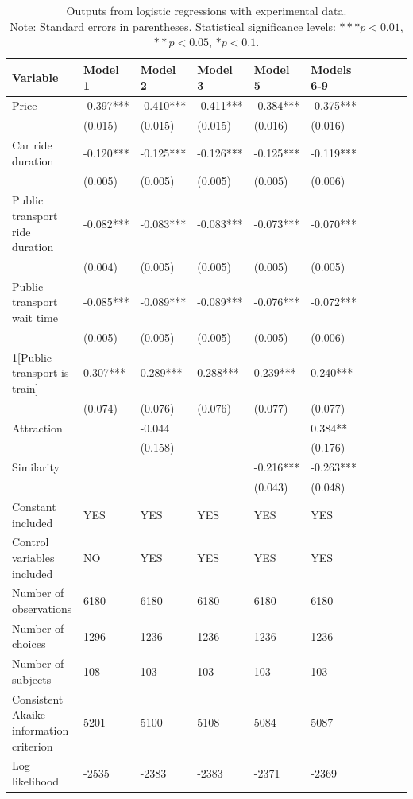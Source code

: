 \documentclass[a4paper,12pt]{article}
\begin{document}
\section{}\label{appendix:nejcDataRobustnessChecks}
\clearpage
\begin{table}
    \centering
    \scriptsize
    \begin{tabular}{p{5.3cm}*{9}{p{1.5cm}}}
    \toprule
    Variable & Model 1 & Model 2 & Model 3 & Model 5 & Models 6-9 \\
    \midrule
    Price & -0.397*** & -0.410*** & -0.411*** & -0.384*** & -0.375*** \\
     & (0.015) & (0.015) & (0.015) & (0.016) & (0.016) \\
    Car ride duration & -0.120*** & -0.125*** & -0.126*** & -0.125*** & -0.119*** \\
     & (0.005) & (0.005) & (0.005) & (0.005) & (0.006) \\
    Public transport ride duration & -0.082*** & -0.083*** & -0.083*** & -0.073*** & -0.070*** \\
     & (0.004) & (0.005) & (0.005) & (0.005) & (0.005) \\
    Public transport wait time & -0.085*** & -0.089*** & -0.089*** & -0.076*** & -0.072*** \\
     & (0.005) & (0.005) & (0.005) & (0.005) & (0.006) \\
    1[Public transport is train] & 0.307*** & 0.289*** & 0.288*** & 0.239*** & 0.240*** \\
     & (0.074) & (0.076) & (0.076) & (0.077) & (0.077) \\
    Attraction & & -0.044 & & & 0.384** \\
     & & (0.158) & & & (0.176) \\
    Similarity & & & & -0.216*** & -0.263*** \\
     & & & & (0.043) & (0.048) \\
    Constant included & YES & YES & YES & YES & YES \\
    Control variables included & NO & YES & YES & YES & YES \\
    Number of observations & 6180 & 6180 & 6180 & 6180 & 6180 \\
    Number of choices & 1296 & 1236 & 1236 & 1236 & 1236 \\
    Number of subjects & 108 & 103 & 103 & 103 & 103 \\
    Consistent Akaike information criterion & 5201 & 5100 & 5108 & 5084 & 5087 \\
    Log likelihood & -2535 & -2383 & -2383 & -2371 & -2369 \\
    \bottomrule
    \end{tabular}
    \caption{Outputs from logistic regressions with experimental data.\\ Note: Standard errors in parentheses. Statistical significance levels: $*** p<0.01$, $** p<0.05$, $* p<0.1$.}
    \label{tab:logitExperimentalData}
\end{table}
\end{document}
